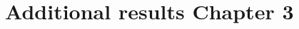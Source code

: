 \begin{comment}
     \multirow{4}{*}{\makecell{$\beta$-2}} & \textit{Ndufs2} & 0.611045507 & 0 & 0 \\
    \cline{2-5}
     & \textit{Cox6a2} & 0.531399941 & 0 & 0 \\
     \cline{2-5}
     & \textit{Ero1lb} & 0.40965907 & 0 & 0 \\
     \midrule

      \multirow{5}{*}{\makecell{$\beta$-3}} & \textit{Cd81} & 1.40144447 & 0 & 0 \\
    \cline{2-5}
     & \textit{Folr1} & 1.010963942 & 0 & 0 \\
     \cline{2-5}
     & \textit{Gnas} & 0.995773308 & 0 & 0 \\
     \cline{2-5}
     & \textit{Fxyd3} & 0.836848657 & 0 & 0 \\
     \bottomrule
  \end{tabularx}
  \vspace{0.1cm}
   \RaggedRight{\footnotesize \\
    \textbf{\textit{Avg. log\textsubscript{2} FC}}, log fold-change of the average expression of the gene across the sub-populations\\ 
   \textbf{\textit{Adj. p-value}}, adjusted p-value based on Bonferroni correction using all genes in the dataset} 
\end{table}

\end{comment}



\section{Additional results Chapter 3}

